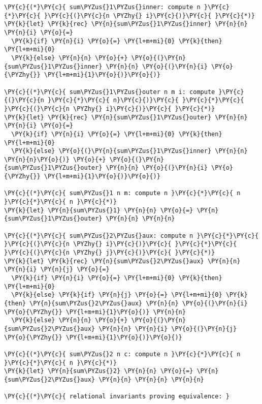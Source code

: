 \begin{Verbatim}[commandchars=\\\{\},codes={\catcode`\$=3\catcode`\^=7\catcode`\_=8}]
\PY{c}{(*}\PY{c}{ sum\PYZus{}1\PYZus{}inner: compute n }\PY{c}{*}\PY{c}{ }\PY{c}{(}\PY{c}{n \PYZhy{} i}\PY{c}{)}\PY{c}{ }\PY{c}{*)}
\PY{k}{let} \PY{k}{rec} \PY{n}{sum\PYZus{}1\PYZus{}inner} \PY{n}{n} \PY{n}{i} \PY{o}{=}
  \PY{k}{if} \PY{n}{i} \PY{o}{=} \PY{l+m+mi}{0} \PY{k}{then} \PY{l+m+mi}{0}
  \PY{k}{else} \PY{n}{n} \PY{o}{+} \PY{o}{(}\PY{n}{sum\PYZus{}1\PYZus{}inner} \PY{n}{n} \PY{o}{(}\PY{n}{i} \PY{o}{\PYZhy{}} \PY{l+m+mi}{1}\PY{o}{)}\PY{o}{)}

\PY{c}{(*}\PY{c}{ sum\PYZus{}1\PYZus{}outer n m i: compute }\PY{c}{(}\PY{c}{n }\PY{c}{*}\PY{c}{ n}\PY{c}{)}\PY{c}{ }\PY{c}{*}\PY{c}{ }\PY{c}{(}\PY{c}{n \PYZhy{} i}\PY{c}{)}\PY{c}{ }\PY{c}{*)}
\PY{k}{let} \PY{k}{rec} \PY{n}{sum\PYZus{}1\PYZus{}outer} \PY{n}{n} \PY{n}{i} \PY{o}{=}
  \PY{k}{if} \PY{n}{i} \PY{o}{=} \PY{l+m+mi}{0} \PY{k}{then} \PY{l+m+mi}{0}
  \PY{k}{else} \PY{o}{(}\PY{n}{sum\PYZus{}1\PYZus{}inner} \PY{n}{n} \PY{n}{n}\PY{o}{)} \PY{o}{+} \PY{o}{(}\PY{n}{sum\PYZus{}1\PYZus{}outer} \PY{n}{n} \PY{o}{(}\PY{n}{i} \PY{o}{\PYZhy{}} \PY{l+m+mi}{1}\PY{o}{)}\PY{o}{)}

\PY{c}{(*}\PY{c}{ sum\PYZus{}1 n m: compute n }\PY{c}{*}\PY{c}{ n }\PY{c}{*}\PY{c}{ n }\PY{c}{*)}
\PY{k}{let} \PY{n}{sum\PYZus{}1} \PY{n}{n} \PY{o}{=} \PY{n}{sum\PYZus{}1\PYZus{}outer} \PY{n}{n} \PY{n}{n}

\PY{c}{(*}\PY{c}{ sum\PYZus{}2\PYZus{}aux: compute n }\PY{c}{*}\PY{c}{ }\PY{c}{(}\PY{c}{n \PYZhy{} i}\PY{c}{)}\PY{c}{ }\PY{c}{*}\PY{c}{ }\PY{c}{(}\PY{c}{n \PYZhy{} j}\PY{c}{)}\PY{c}{ }\PY{c}{*)}
\PY{k}{let} \PY{k}{rec} \PY{n}{sum\PYZus{}2\PYZus{}aux} \PY{n}{n} \PY{n}{i} \PY{n}{j} \PY{o}{=}
  \PY{k}{if} \PY{n}{i} \PY{o}{=} \PY{l+m+mi}{0} \PY{k}{then} \PY{l+m+mi}{0}
  \PY{k}{else} \PY{k}{if} \PY{n}{j} \PY{o}{=} \PY{l+m+mi}{0} \PY{k}{then} \PY{n}{sum\PYZus{}2\PYZus{}aux} \PY{n}{n} \PY{o}{(}\PY{n}{i} \PY{o}{\PYZhy{}} \PY{l+m+mi}{1}\PY{o}{)} \PY{n}{n}
  \PY{k}{else} \PY{n}{n} \PY{o}{+} \PY{o}{(}\PY{n}{sum\PYZus{}2\PYZus{}aux} \PY{n}{n} \PY{n}{i} \PY{o}{(}\PY{n}{j} \PY{o}{\PYZhy{}} \PY{l+m+mi}{1}\PY{o}{)}\PY{o}{)}

\PY{c}{(*}\PY{c}{ sum\PYZus{}2 n c: compute n }\PY{c}{*}\PY{c}{ n }\PY{c}{*}\PY{c}{ n }\PY{c}{*)}
\PY{k}{let} \PY{n}{sum\PYZus{}2} \PY{n}{n} \PY{o}{=} \PY{n}{sum\PYZus{}2\PYZus{}aux} \PY{n}{n} \PY{n}{n} \PY{n}{n}

\PY{c}{(*}\PY{c}{ relational invariants proving equivalence: }


\end{Verbatim}
